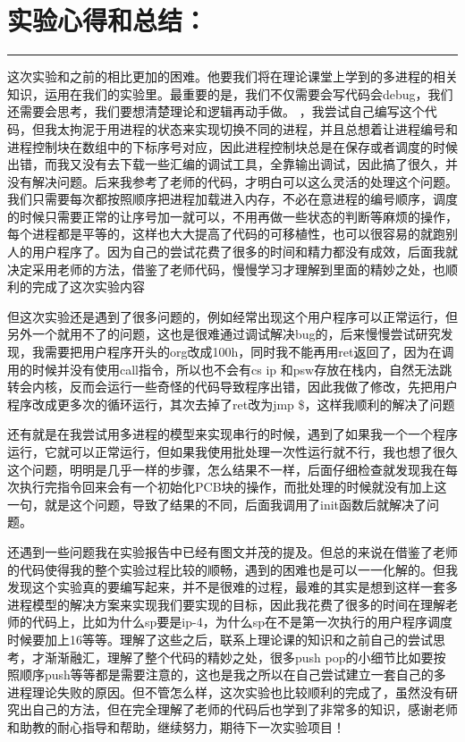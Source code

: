 \documentclass[UTF8]{article}
\begin{document}
\section{实验心得和总结：}
\noindent\rule[0.2\baselineskip]{\textwidth}{0.5pt}
\heiti
\par 这次实验和之前的相比更加的困难。他要我们将在理论课堂上学到的多进程的相关知识，运用在我们的实验里。最重要的是，我们不仅需要会写代码会debug，我们还需要会思考，我们要想清楚理论和逻辑再动手做。
，我尝试自己编写这个代码，但我太拘泥于用进程的状态来实现切换不同的进程，并且总想着让进程编号和进程控制块在数组中的下标序号对应，因此进程控制块总是在保存或者调度的时候出错，而我又没有去下载一些汇编的调试工具，全靠输出调试，因此搞了很久，并没有解决问题。后来我参考了老师的代码，才明白可以这么灵活的处理这个问题。我们只需要每次都按照顺序把进程加载进入内存，不必在意进程的编号顺序，调度的时候只需要正常的让序号加一就可以，不用再做一些状态的判断等麻烦的操作，每个进程都是平等的，这样也大大提高了代码的可移植性，也可以很容易的就跑别人的用户程序了。因为自己的尝试花费了很多的时间和精力都没有成效，后面我就决定采用老师的方法，借鉴了老师代码，慢慢学习才理解到里面的精妙之处，也顺利的完成了这次实验内容
\par 但这次实验还是遇到了很多问题的，例如经常出现这个用户程序可以正常运行，但另外一个就用不了的问题，这也是很难通过调试解决bug的，后来慢慢尝试研究发现，我需要把用户程序开头的org改成100h，同时我不能再用ret返回了，因为在调用的时候并没有使用call指令，所以也不会有cs ip 和psw存放在栈内，自然无法跳转会内核，反而会运行一些奇怪的代码导致程序出错，因此我做了修改，先把用户程序改成更多次的循环运行，其次去掉了ret改为jmp \$，这样我顺利的解决了问题
\par 还有就是在我尝试用多进程的模型来实现串行的时候，遇到了如果我一个一个程序运行，它就可以正常运行，但如果我使用批处理一次性运行就不行，我也想了很久这个问题，明明是几乎一样的步骤，怎么结果不一样，后面仔细检查就发现我在每次执行完指令回来会有一个初始化PCB块的操作，而批处理的时候就没有加上这一句，就是这个问题，导致了结果的不同，后面我调用了init函数后就解决了问题。
\par 还遇到一些问题我在实验报告中已经有图文并茂的提及。但总的来说在借鉴了老师的代码使得我的整个实验过程比较的顺畅，遇到的困难也是可以一一化解的。但我发现这个实验真的要编写起来，并不是很难的过程，最难的其实是想到这样一套多进程模型的解决方案来实现我们要实现的目标，因此我花费了很多的时间在理解老师的代码上，比如为什么sp要是ip-4，为什么sp在不是第一次执行的用户程序调度时候要加上16等等。理解了这些之后，联系上理论课的知识和之前自己的尝试思考，才渐渐融汇，理解了整个代码的精妙之处，很多push pop的小细节比如要按照顺序push等等都是需要注意的，这也是我之所以在自己尝试建立一套自己的多进程理论失败的原因。但不管怎么样，这次实验也比较顺利的完成了，虽然没有研究出自己的方法，但在完全理解了老师的代码后也学到了非常多的知识，感谢老师和助教的耐心指导和帮助，继续努力，期待下一次实验项目！
\end{document}

